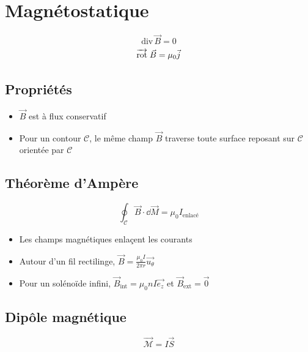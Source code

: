 \documentclass[openany]{book}
\begin{document}
\section{Magnétostatique}
\[ \text{div} \, \vec{B} = 0 \]
\[ \overrightarrow{\text{rot}} \; \vec{B} = \mu_0 \vec{j} \]

\subsection{Propriétés}
\begin{itemize}
    \item $\vec{B}$ est à flux conservatif
    \item Pour un contour $\mathcal{C}$, le même champ $\vec{B}$ traverse toute surface reposant sur $\mathcal{C}$ orientée par $\mathcal{C}$
\end{itemize}

\subsection{Théorème d'Ampère}

\[ \oint_{\mathcal{C}} \vec{B}\cdot \dd \vec{M} = \mu_0 I_{\text{enlacé}} \]

\begin{itemize}
    \item Les champs magnétiques enlaçent les courants
    \item Autour d'un fil rectilinge, $\vec{B} = \frac{\mu_0 I}{2 \pi r} \vec{u_\theta}$
    \item Pour un solénoïde infini, $\vec{B}_{\text{int}} = \mu_0 n I \vec{e_z}$ et $\vec{B}_{\text{ext}} = \vec{0}$
\end{itemize}

\subsection{Dipôle magnétique}
\[ \vec{\mathcal{M}} = I \vec{S} \]
\end{document}
